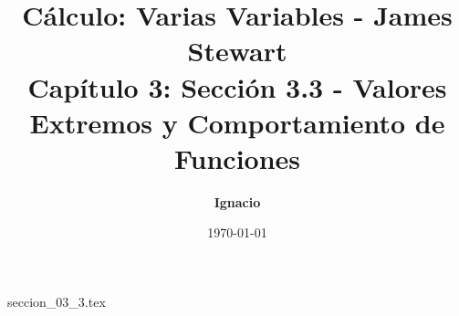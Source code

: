 \documentclass[11pt,spanish,oneside]{report}
\title{\textbf{Cálculo: Varias Variables - James Stewart} \\ \Large Capítulo 3: Sección 3.3 - Valores Extremos y Comportamiento de Funciones}
\author{\textbf{Ignacio}}
\date{\today}
\begin{document}
\maketitle

{seccion_03_3.tex}
\end{document}
